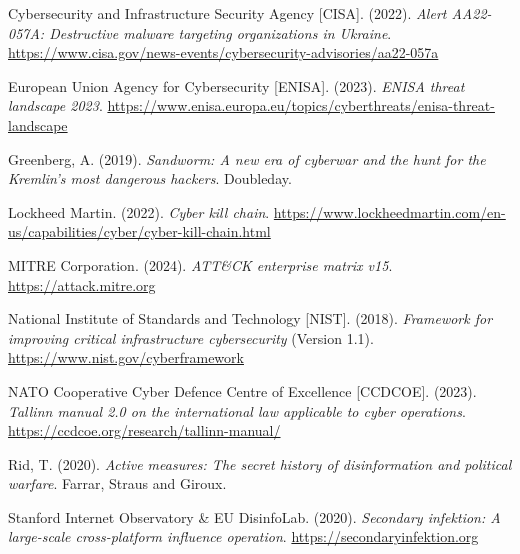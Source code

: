 \documentclass[11pt,a4paper]{article}
\begin{document}
\hangindent=1.27cm
Cybersecurity and Infrastructure Security Agency [CISA]. (2022). \textit{Alert AA22-057A: Destructive malware targeting organizations in Ukraine}. \url{https://www.cisa.gov/news-events/cybersecurity-advisories/aa22-057a}

\hangindent=1.27cm
European Union Agency for Cybersecurity [ENISA]. (2023). \textit{ENISA threat landscape 2023}. \url{https://www.enisa.europa.eu/topics/cyberthreats/enisa-threat-landscape}

\hangindent=1.27cm
Greenberg, A. (2019). \textit{Sandworm: A new era of cyberwar and the hunt for the Kremlin's most dangerous hackers}. Doubleday.

\hangindent=1.27cm
Lockheed Martin. (2022). \textit{Cyber kill chain}. \url{https://www.lockheedmartin.com/en-us/capabilities/cyber/cyber-kill-chain.html}

\hangindent=1.27cm
MITRE Corporation. (2024). \textit{ATT\&CK enterprise matrix v15}. \url{https://attack.mitre.org}

\hangindent=1.27cm
National Institute of Standards and Technology [NIST]. (2018). \textit{Framework for improving critical infrastructure cybersecurity} (Version 1.1). \url{https://www.nist.gov/cyberframework}

\hangindent=1.27cm
NATO Cooperative Cyber Defence Centre of Excellence [CCDCOE]. (2023). \textit{Tallinn manual 2.0 on the international law applicable to cyber operations}. \url{https://ccdcoe.org/research/tallinn-manual/}

\hangindent=1.27cm
Rid, T. (2020). \textit{Active measures: The secret history of disinformation and political warfare}. Farrar, Straus and Giroux.

\hangindent=1.27cm
Stanford Internet Observatory \& EU DisinfoLab. (2020). \textit{Secondary infektion: A large-scale cross-platform influence operation}. \url{https://secondaryinfektion.org}
\end{document}
